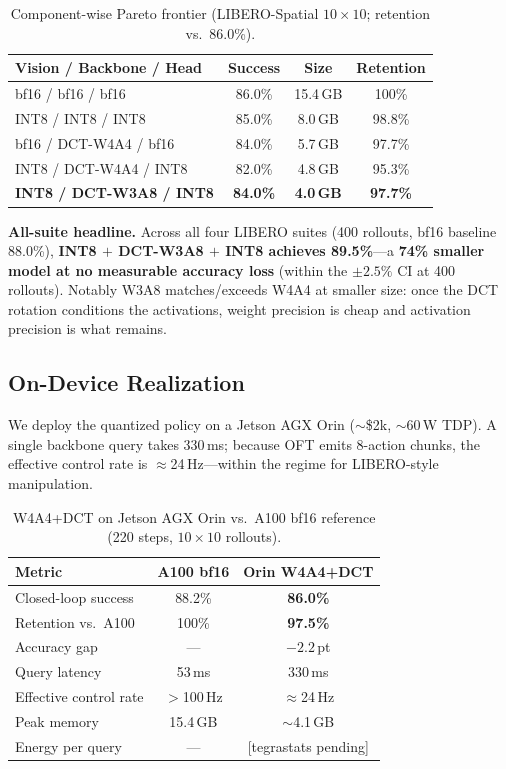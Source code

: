 \documentclass[conference]{IEEEtran}
\begin{document}
\begin{table}[h]\centering
\caption{Component-wise Pareto frontier (LIBERO-Spatial $10\times10$; retention vs.\ 86.0\%).}
\label{tab:component}
\begin{tabular}{lccc}
\toprule
Vision / Backbone / Head & Success & Size & Retention \\
\midrule
bf16 / bf16 / bf16 & 86.0\% & 15.4\,GB & 100\% \\
INT8 / INT8 / INT8 & 85.0\% & 8.0\,GB & 98.8\% \\
bf16 / DCT-W4A4 / bf16 & 84.0\% & 5.7\,GB & 97.7\% \\
INT8 / DCT-W4A4 / INT8 & 82.0\% & 4.8\,GB & 95.3\% \\
\textbf{INT8 / DCT-W3A8 / INT8} & \textbf{84.0\%} & \textbf{4.0\,GB} & \textbf{97.7\%} \\
\bottomrule
\end{tabular}
\end{table}

\textbf{All-suite headline.}
Across all four LIBERO suites (400 rollouts, bf16 baseline 88.0\%), \textbf{INT8 $+$ DCT-W3A8
$+$ INT8 achieves 89.5\%}---a \textbf{74\% smaller model at no measurable accuracy loss}
(within the $\pm2.5\%$ CI at 400 rollouts). Notably W3A8 matches/exceeds W4A4 at smaller size:
once the DCT rotation conditions the activations, weight precision is cheap and activation
precision is what remains.

\subsection{On-Device Realization}
\label{sec:device}

We deploy the quantized policy on a Jetson AGX Orin ($\sim$\$2k, $\sim$60\,W TDP). A single
backbone query takes 330\,ms; because OFT emits 8-action chunks, the effective control rate
is $\approx$24\,Hz---within the regime for LIBERO-style manipulation.

\begin{table}[t]\centering
\caption{W4A4+DCT on Jetson AGX Orin vs.\ A100 bf16 reference (220 steps, $10\times10$ rollouts).}
\label{tab:device}
\begin{tabular}{lcc}
\toprule
Metric & A100 bf16 & Orin W4A4+DCT \\
\midrule
Closed-loop success & 88.2\% & \textbf{86.0\%} \\
Retention vs.\ A100 & 100\% & \textbf{97.5\%} \\
Accuracy gap & --- & $-2.2$\,pt \\
Query latency & 53\,ms & 330\,ms \\
Effective control rate & $>$100\,Hz & $\approx$24\,Hz \\
Peak memory & 15.4\,GB & $\sim$4.1\,GB \\
Energy per query & --- & [tegrastats pending] \\
\bottomrule
\end{tabular}
\end{table}
\end{document}
